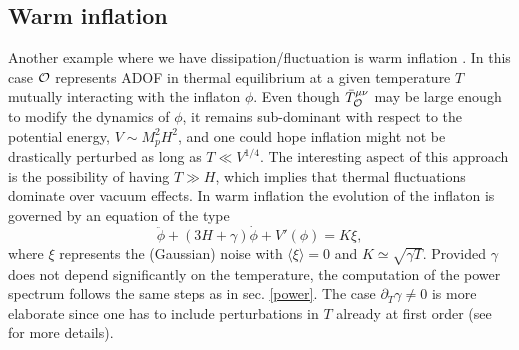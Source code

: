 \documentclass[11pt,amsmath,floats,floatfix,nofootinbib,secnumarabic, superscriptaddress, tightenlines]{revtex4}
\newcommand{\beq}{\begin{equation}}
\newcommand{\eeq}{\end{equation}}
\newcommand{\calo}{{\cal O}}
\begin{document}
{\subsection{Warm inflation}\label{secwarm}

Another example where we have dissipation/fluctuation is warm inflation \cite{berera1,berera2,warm}. In this case $\calo$ represents ADOF in thermal equilibrium at a given temperature $T$ mutually interacting with the inflaton $\phi$. Even though $\bar T^{\mu\nu}_\calo$ may be large enough to modify the dynamics of $\phi$, it remains sub-dominant with respect to the potential energy, $V \sim M_p^2H^2$, and one could hope inflation might not be drastically perturbed as long as $T \ll V^{1/4}$. The interesting aspect of this approach is the possibility of having $T \gg H$, which implies that thermal fluctuations dominate over vacuum effects. In warm inflation the evolution of the inflaton is governed by an equation of the type \cite{warm}
\beq
\label{warmd1}
\ddot \phi + (3 H+ \gamma) \dot\phi + V'(\phi) = K \xi,
\eeq
where $\xi$ represents the (Gaussian) noise with $\langle \xi\rangle=0$ and $K \simeq \sqrt{\gamma T}$. Provided $\gamma$ does not depend significantly on the temperature, the computation of the power spectrum follows the same steps as in sec. \ref{power}. The case $\partial_T \gamma \neq 0$ is more elaborate since one has to include perturbations in $T$ already at first order (see \cite{warmf33,berera11} for more details).

}
\end{document}
